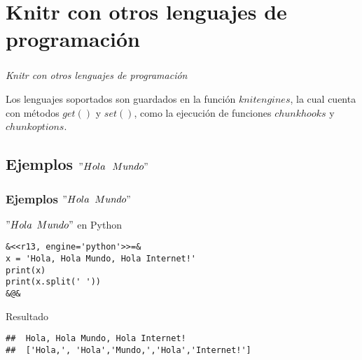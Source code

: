 \documentclass[11pt]{beamer}					%
\begin{document}
			
\section{Knitr con otros lenguajes de programación}	
		 \begin{frame}[fragile]
			\frametitle{}
			\begin{huge}
			\begin{center}
				\emph{\textit{Knitr con otros lenguajes de programación}}
			\end{center}
			\end{huge}
\begin{block}{}
				Los lenguajes soportados  son  guardados  en  la  función $knitengines$,  la  cual  cuenta  con métodos $get()$ y $set()$,  como  la  ejecución  de  funciones  $chunk hooks$  y  $chunk options$.
			\end{block}			
			
		\end{frame}		
    		\subsection{Ejemplos $"Hola$ $Mundo"$}			
			\begin{frame}[fragile]
				\frametitle{Ejemplos $"Hola$ $Mundo"$}							
					\begin{block}{$"Hola$ $Mundo"$ en Python}
					\begin{tiny}\begin{lstlisting}[frame=single,style=base]				
&<<r13, engine='python'>>=&
x = 'Hola, Hola Mundo, Hola Internet!'
print(x)
print(x.split(' '))
&@&
				\end{lstlisting}	\end{tiny}
				\end{block}	
				\begin{block}{Resultado}
					\begin{tiny}\begin{lstlisting}[frame=single,style=base]				
##  Hola, Hola Mundo, Hola Internet!
##  ['Hola,', 'Hola','Mundo,','Hola','Internet!']
				\end{lstlisting}	\end{tiny}
				\end{block}
						
			\end{frame}
\end{document}
